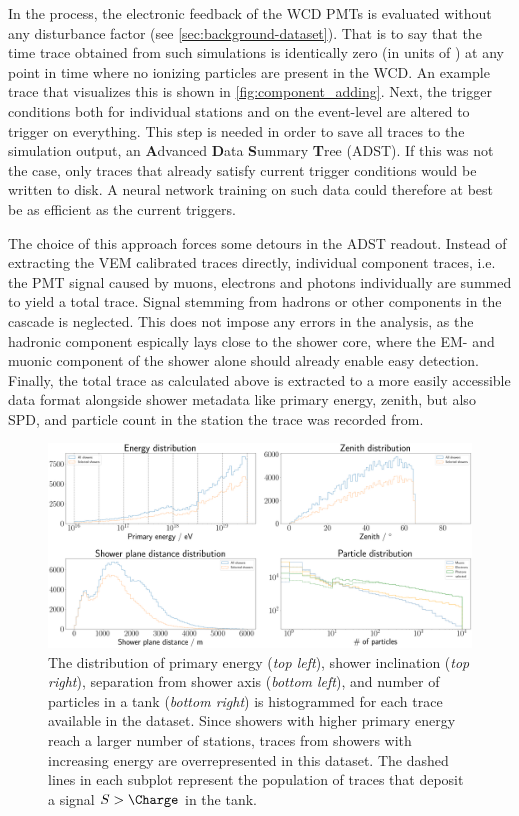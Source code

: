 In the process, the electronic feedback of the WCD PMTs is evaluated without any disturbance factor (see \autoref{sec:background-dataset}). That is to say that 
the time trace obtained from such simulations is identically zero (in units of \SI{}{\ADC}) at any point in time where no ionizing particles are present in the 
WCD. An example trace that visualizes this is shown in \autoref{fig:component_adding}. Next, the trigger conditions both for individual stations and on the 
event-level are altered to trigger on everything. This step is needed in order to save all traces to the simulation output, an \textbf{A}dvanced \textbf{D}ata 
\textbf{S}ummary \textbf{T}ree (ADST). If this was not the case, only traces that already satisfy current trigger conditions would be written to disk. A neural 
network training on such data could therefore at best be as efficient as the current triggers.

The choice of this approach forces some detours in the ADST readout. Instead of extracting the VEM calibrated traces directly, individual component traces, i.e. 
the PMT signal caused by muons, electrons and photons individually are summed to yield a total \SI{}{\ADC} trace. Signal stemming from hadrons or other components 
in the cascade is neglected. This does not impose any errors in the analysis, as the hadronic component espically lays close to the shower core, where the EM- and 
muonic component of the shower alone should already enable easy detection. Finally, the total trace as calculated above is extracted to a more easily accessible 
data format alongside shower metadata like primary energy, zenith, but also SPD, and particle count in the station the trace was recorded from.

\begin{figure}
	\centering
	\includegraphics[width=1\textwidth]{./plots/physics_statistics.png}
	\caption{The distribution of primary energy (\textit{top left}), shower inclination (\textit{top right}), separation from shower axis (\textit{bottom left}), 
	and number of particles in a tank (\textit{bottom right}) is histogrammed for each trace available in the dataset. Since showers with higher primary energy 
	reach a larger number of stations, traces from showers with increasing energy are overrepresented in this dataset. The dashed lines in each subplot represent 
	the population of traces that deposit a signal 
	$S>\SI{}{\Charge}$ in the tank.}
	\label{fig:physics-data}
\end{figure}

